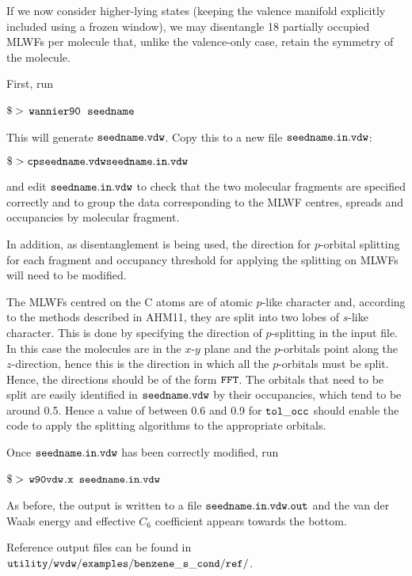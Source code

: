\documentclass{report}
\newcommand{\wvdw}{{$\tt{w90vdw}$}}
\newcommand{\wannier}{{$\tt{wannier90}$}}
\begin{document}
If we now consider higher-lying states (keeping the valence manifold
explicitly included using a frozen window), we may disentangle 18
partially occupied MLWFs per molecule that, unlike the valence-only
case, retain the symmetry of the molecule. 

First, run 

$\tt{\$>}$ \wannier\ $\tt{seedname}$

This will generate $\tt{seedname.vdw}$. Copy this to a new file
$\tt{seedname.in.vdw}$:

$\tt{\$> cp seedname.vdw seedname.in.vdw}$

and edit $\tt{seedname.in.vdw}$ to check that the two molecular
fragments are specified correctly and to group the data corresponding
to the MLWF centres, spreads and occupancies by molecular fragment. 

In addition, as disentanglement is being used, the direction for
$p$-orbital splitting for each fragment and occupancy threshold for
applying the splitting on MLWFs will need to be modified. 

The MLWFs centred on the C atoms are of atomic $p$-like character and, 
according to the methods described in AHM11, they are split into two
lobes of $s$-like character. This is done by specifying the direction
of $p$-splitting in the input file. In this case the molecules are in
the $x$-$y$ plane and the $p$-orbitals point along the $z$-direction,
hence this is the direction in which all the $p$-orbitals must be
split. Hence, the directions should be of the form $\tt{F F T}$. The
orbitals that need to be split are easily identified in
$\tt{seedname.vdw}$ by their occupancies, which tend to be around
0.5. Hence a value of between 0.6 and 0.9 for $\tt{tol\_occ}$ should
enable the code to apply the splitting algorithms to the appropriate
orbitals. 

Once $\tt{seedname.in.vdw}$ has been correctly modified, run

$\tt{\$>}$ \wvdw$\tt{.x}$ $\tt{seedname.in.vdw}$

As before, the output is written to a file $\tt{seedname.in.vdw.out}$ and the van der Waals
energy and effective $C_6$ coefficient appears towards the bottom.

Reference output files can be found in  $\tt{utility/wvdw/examples/benzene\_s\_cond/ref/}$.
\end{document}

